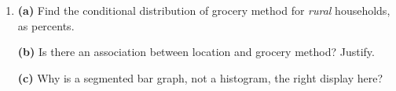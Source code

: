 \documentclass[12pt]{article}
\begin{document}
\begin{enumerate}[leftmargin=1.9em, itemsep=0.08in, resume]

  \boxguard[14]
  \item \textbf{(a)} Find the conditional distribution of grocery method for \emph{rural}
        households, as percents.\\[4pt]

        \vspace{4pt}
        \boxguard[14]
        \textbf{(b)} Is there an association between location and grocery method? Justify.\\[4pt]

        \vspace{4pt}
        \boxguard[14]
        \textbf{(c)} Why is a segmented bar graph, not a histogram, the right display here?\\[4pt]

\end{enumerate}
\end{document}
